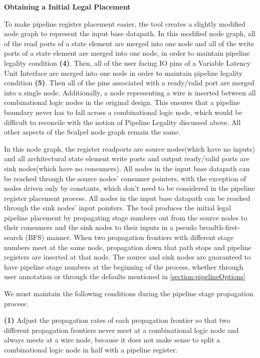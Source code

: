 {\bf Obtaining a Initial Legal Placement}

To make pipeline register placement easier, the tool creates a slightly modified node graph to represent the input base datapath. In this modified node graph, all of the read ports of a state element are merged into one node and all of the write ports of a state element are merged into one node, in order to maintain pipeline legality condition {\bf (4)}. Then, all of the user facing IO pins of a Variable Latency Unit Interface are merged into one node in order to maintain pipeline legality condition {\bf (5)}. Then all of the pins associated with a ready/valid port are merged into a single node. Additionally, a node representing a wire is inserted between all combinational logic nodes in the original design. This ensures that a pipeline boundary never has to fall across a combinational logic node, which would be difficult to reconcile with the notion of Pipeline Legality discussed above. All other aspects of the Scalpel node graph remain the same.

In this node graph, the register readports are source nodes(which have no inputs) and all architectural state element write ports and output ready/valid ports are sink nodes(which have no consumers). All nodes in the input base datapath can be reached through the source nodes' consumer pointers, with the exception of nodes driven only by constants, which don't need to be considered in the pipeline register placement process. All nodes in the input base datapath can be reached through the sink nodes' input pointers. The tool produces the initial legal pipeline placement by propagating stage numbers out from the source nodes to their consumers and the sink nodes to their inputs in a pseudo breadth-first-search (BFS) manner. When two propagation frontiers with different stage numbers meet at the same node, propagation down that path stops and pipeline registers are inserted at that node. The source and sink nodes are guaranteed to have pipeline stage numbers at the beginning of the process, whether through user annotation or through the defaults mentioned in \ref{section:pipelineOptions}

We must maintain the following conditions during the pipeline stage propagation process:

{\bf (1)} Adjust the propagation rates of each propagation frontier so that two different propagation frontiers never meet at a combinational logic node and always meets at a wire node, because it does not make sense to split a combinational logic node in half with a pipeline register.

